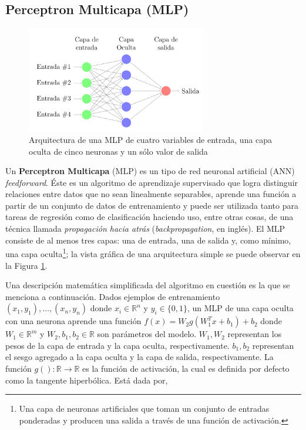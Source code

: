 \subsection{Perceptron Multicapa (MLP)}
    \begin{figure}
    \centering%
    \includegraphics[width=0.7\textwidth]{images/ejemplo_mlp}%
    \caption{Arquitectura de una MLP de cuatro variables de entrada, una capa
            oculta de cinco neuronas y un sólo valor de salida}\label{fig:mlp}
    \end{figure}

  \par Un \textbf{Perceptron Multicapa} (MLP)\cite{mlp_intro1, mlp_intro2} es un tipo
    de red neuronal artificial (ANN) \textit{feedforward}.
    Éste es un algoritmo de aprendizaje supervisado que logra distinguir
    relaciones entre datos que no sean linealmente separables, aprende una función
    a partir de un conjunto de datos de entrenamiento y puede ser
    utilizada tanto para tareas de regresión como de clasificación haciendo uso, entre
    otras cosas, de una técnica llamada \textit{propagación hacia atrás}\cite{backpropagation}
    (\textit{backpropagation}, en inglés).
    El MLP consiste de al menos tres capas: una de entrada, una de salida y,
    como mínimo, una capa oculta\footnote{Una capa de neuronas artificiales que toman un conjunto
    de entradas ponderadas y producen una salida a través de una función de activación.};
    la vista gráfica de una arquitectura simple se puede observar en la
    Figura \ref{fig:mlp}.

  \par Una descripción matemática simplificada del algoritmo en cuestión es la
    que se menciona a continuación.
    Dados ejemplos de entrenamiento $(x_{1}, y_{1}), \dots, (x_{n}, y_{n})$
    donde $x_{i} \in \mathbb{R}^{n}$ y $y_{i} \in \{0,1\}$, un MLP de una capa oculta
    con una neurona aprende una función $f(x) = W_{2}g(W_{1}^{T} x + b_{1}) + b_{2}$
    donde $W_{1} \in \mathbb{R}^{m}$ y $W_{2}, b_{1}, b_{2} \in \mathbb{R}$ son
    parámetros del modelo. $W_{1}, W_{2}$ representan los pesos de la capa de entrada y la
    capa oculta, respectivamente. $b_{1}, b_{2}$ representan el sesgo agregado a
    la capa oculta y la capa de salida, respectivamente. La función
    $g(): \mathbb{R} \rightarrow \mathbb{R}$ es la función de activación, la cual
    es definida por defecto como la tangente hiperbólica. Está dada por,

